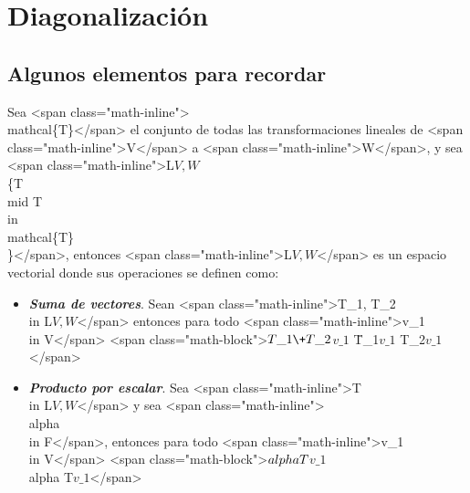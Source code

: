 \documentclass{report}
\begin{document}
    \tableofcontents
    \pagebreak
    \chapter{ Diagonalización }

    \section{Algunos elementos para recordar}

    \begin{defBox}
        Sea <span class="math-inline">\\mathcal\{T\}</span> el conjunto de todas las transformaciones lineales de <span class="math-inline">V</span> a <span class="math-inline">W</span>, y sea <span class="math-inline">L\(V,W\) \= \\\{T \\mid T \\in \\mathcal\{T\}\\\}</span>, entonces <span class="math-inline">L\(V,W\)</span> es un espacio vectorial donde sus operaciones se definen como:

        \begin{itemize}
            \item \textit{\textbf{Suma de vectores}}. Sean <span class="math-inline">T\_1, T\_2 \\in L\(V,W\)</span> entonces para todo <span class="math-inline">v\_1 \\in V</span>
            <span class="math-block">\(T\_1\+T\_2\)\(v\_1\) \= T\_1\(v\_1\) \+ T\_2\(v\_1\)</span>
            \item \textit{\textbf{Producto por escalar}}. Sea <span class="math-inline">T \\in L\(V,W\)</span> y sea <span class="math-inline">\\alpha \\in F</span>, entonces para todo <span class="math-inline">v\_1 \\in V</span>
            <span class="math-block">\(\\alpha T\)\(v\_1\) \= \\alpha T\(v\_1\)</span>
        \end{itemize}
    \end{defBox}
\end{document}
